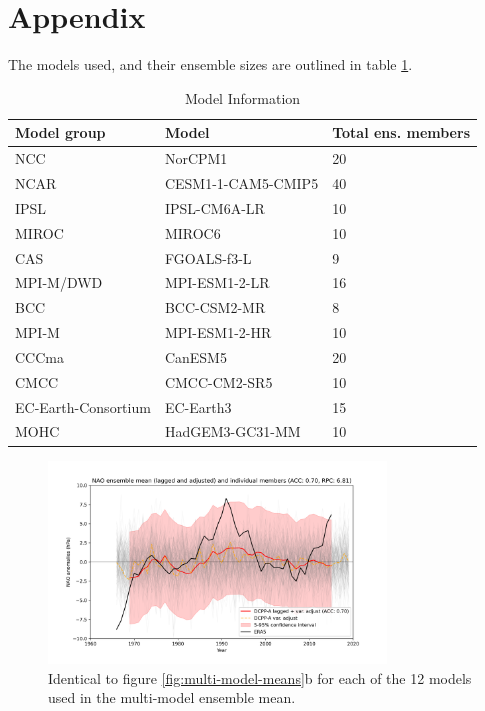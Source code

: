 \documentclass{article}
\begin{document}
\printbibliography

\section*{Appendix}

The models used, and their ensemble sizes are outlined in table \ref{tab:models}.


\begin{table}[ht]
    \centering
    \caption{Model Information}
    \begin{tabular}{lll}
        \toprule
        Model group & Model & Total ens. members \\
        \midrule
        NCC & NorCPM1 & 20 \\
        NCAR & CESM1-1-CAM5-CMIP5 & 40 \\
        IPSL & IPSL-CM6A-LR & 10 \\
        MIROC & MIROC6 & 10 \\
        CAS & FGOALS-f3-L & 9 \\
        MPI-M/DWD & MPI-ESM1-2-LR & 16 \\
        BCC & BCC-CSM2-MR & 8 \\
        MPI-M & MPI-ESM1-2-HR & 10 \\
        CCCma & CanESM5 & 20 \\
        CMCC & CMCC-CM2-SR5 & 10 \\
        EC-Earth-Consortium & EC-Earth3 & 15 \\
        MOHC & HadGEM3-GC31-MM & 10 \\
        \bottomrule
    \end{tabular}
    \label{tab:models}
\end{table}


\begin{figure}
    \centering
    \includegraphics[width=0.8\textwidth]{plots/nao_ensemble_mean_and_individual_members_lagged_and_adjusted.png}
    \caption{Identical to figure \ref*{fig:multi-model-means}b for each of the 12 models used in the multi-model ensemble mean.}
    \label{fig:ind-models-lag-adjust}
\end{figure}



\end{document}
